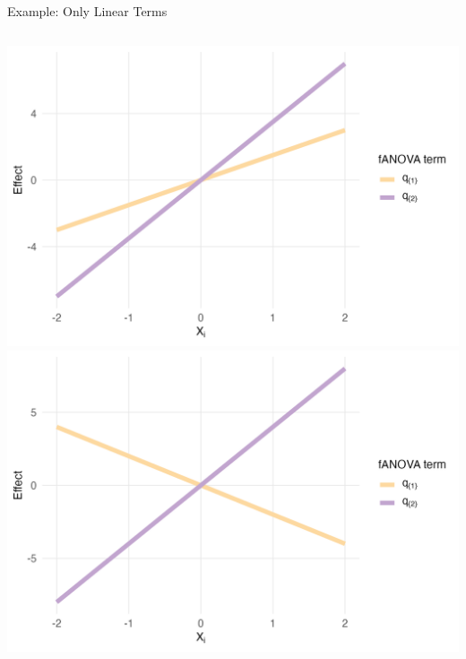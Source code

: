 \begin{frame}{Example: Only Linear Terms}
  \begin{columns}
      \includegraphics[width=\linewidth]{../images/experiment_section/linear_a1p15_a2p35_a11p00_a22p00_a12p00_rhop00_main.png}
      \includegraphics[width=\linewidth]{../images/experiment_section/linear_a1m20_a2p40_a11p00_a22p00_a12p00_rhop00_main.png}
  \end{columns}
\end{frame}


